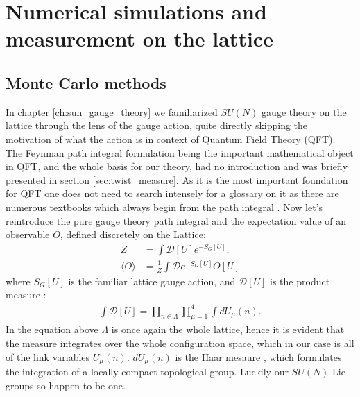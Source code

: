 \documentclass[english,twoside,openright]{UH_TCM_MSc}
\begin{document}
\chapter{Numerical simulations and measurement on the lattice} \label{ch:measurement}

\section{Monte Carlo methods}

In chapter \ref{ch:sun_gauge_theory} we familiarized $SU(N)$ gauge theory on the lattice through the lens of the gauge action, quite directly skipping the motivation of what the action is in context of Quantum Field Theory (QFT). The Feynman path integral formulation being the important mathematical object in QFT, and the whole basis for our theory, had no introduction and was briefly presented in section \ref{sec:twist_measure}. As it is the most important foundation for QFT one does not need to search intensely for a glossary on it as there are numerous textbooks which always begin from the path integral \cite{Creutz:1983njd, gattringer2009quantum, Rothe:1992nt}. Now let's reintroduce the pure gauge theory path integral and the expectation value of an observable $O$, defined discretely on the Lattice:
\begin{align}
    Z &= \int \mathcal{D}[U] e^{-S_G[U]}, \label{eq:path_integral} \\
    \langle O \rangle &= \frac{1}{Z}\int \mathcal{D}e^{-S_G[U]}O[U]
\end{align}
where $S_G[U]$ is the familiar lattice gauge action, and $\mathcal{D}[U]$ is the product measure \cite[ch. 3]{gattringer2009quantum}:
\begin{align}
    \int \mathcal{D}[U] = \prod_{n\in \Lambda}\prod_{\mu=1}^4 \int dU_{\mu}(n).
\end{align}
In the equation above $\Lambda$ is once again the whole lattice, hence it is evident that the measure integrates over the whole configuration space, which in our case is all of the link variables $U_\mu(n)$. $dU_{\mu}(n)$ is the Haar mesaure \cite{Haar1933,Howes1995}, which formulates the integration of a locally compact topological group. Luckily our $SU(N)$ Lie groups so happen to be one. 
\end{document}

